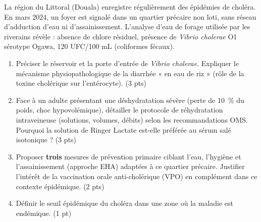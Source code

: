 \documentclass[11pt]{article}
\begin{document}
\begin{exercice}
La région du Littoral (Douala) enregistre régulièrement des épidémies de choléra. En mars 2024, un foyer est signalé dans un quartier précaire non loti, sans réseau d'adduction d'eau ni d'assainissement. L'analyse d'eau de forage utilisée par les riverains révèle : absence de chlore résiduel, présence de \textit{Vibrio cholerae} O1 sérotype Ogawa, \num{120} UFC/100 mL (coliformes fécaux).
\begin{enumerate}
    \item Préciser le réservoir et la porte d'entrée de \textit{Vibrio cholerae}. Expliquer le mécanisme physiopathologique de la diarrhée « en eau de riz » (rôle de la toxine cholérique sur l'entérocyte). (3 pts)
    \item Face à un adulte présentant une déshydratation sévère (perte de \SI{10}{\%} du poids, choc hypovolémique), détailler le protocole de réhydratation intraveineuse (solutions, volumes, débits) selon les recommandations OMS. Pourquoi la solution de Ringer Lactate est-elle préférée au sérum salé isotonique ? (3 pts)
    \item Proposer \textbf{trois} mesures de prévention primaire ciblant l'eau, l'hygiène et l'assainissement (approche EHA) adaptées à ce quartier précaire. Justifier l'intérêt de la vaccination orale anti-cholérique (VPO) en complément dans ce contexte épidémique. (2 pts)
    \item Définir le seuil épidémique du choléra dans une zone où la maladie est endémique. (1 pt)
\end{enumerate}
\end{exercice}
\end{document}
